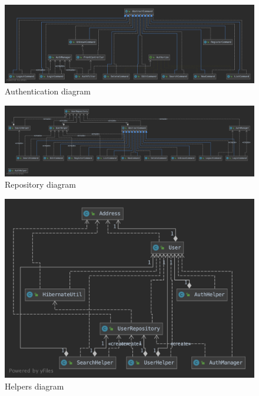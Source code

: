 \documentclass[a4paper]{report}
\begin{document}
	\begin{figure}
		\centering
		\includegraphics[width=\textwidth]{images/Auth.png}
		\caption{Authentication diagram}
		\label{fig:auth_diagram}
	\end{figure} 
	
	\begin{figure}
		\centering
		\includegraphics[width=\textwidth]{images/Repository.png}
		\caption{Repository diagram}
		\label{fig:repository_diagram}
	\end{figure} 

	\begin{figure}
		\centering
		\includegraphics[width=\textwidth]{images/Helpers.png}
		\caption{Helpers diagram}
		\label{fig:helpers_diagram}
	\end{figure} 

	\printbibliography
	
\end{document}
